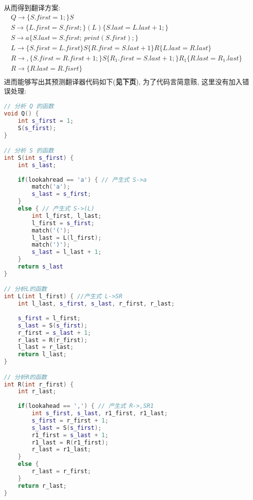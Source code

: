 \documentclass[UTF8]{article}
\begin{document}
从而得到翻译方案:
$$\begin{array}{l}
Q\rightarrow \{S.first=1;\}S\\
S\rightarrow \{L.first=S.first;\} (L) \{S.last=L.last+1;\}\\
S\rightarrow a\{S.last=S.first;\ print(S.first);\}\\
L\rightarrow \{S.first=L.first\}S\{R.first=S.last+1\}R\{L.last=R.last\}\\
R\rightarrow ,\{S.first=R.first+1;\}S\{R_1.first=S.last+1;\}R_1\{R.last=R_1.last\}\\
R\rightarrow \{R.last=R.fisrt\}\\
\end{array}$$
进而能够写出其预测翻译器代码如下(\textbf{见下页}), 为了代码言简意赅, 这里没有加入错误处理:
\newpage
\begin{lstlisting}[language=c++]
// 分析 Q 的函数
void Q() {
	int s_first = 1;
	S(s_first);
}

// 分析 S 的函数
int S(int s_first) {
	int s_last;
	
	if(lookahread == 'a') { // 产生式 S->a
		match('a');
		s_last = s_first;
	}
	else { // 产生式 S->(L)
		int l_first, l_last;
		l_first = s_first;
		match('(');
		l_last = L(l_first);
		match(')');
		s_last = l_last + 1;
	}
	return s_last
}

// 分析L的函数
int L(int l_first) { //产生式 L->SR
	int l_last, s_first, s_last, r_first, r_last;
	
	s_first = l_first;
	s_last = S(s_first);
	r_first = s_last + 1;
	r_last = R(r_first);
	l_last = r_last;
	return l_last;
}

// 分析R的函数
int R(int r_first) {
	int r_last;
	
	if(lookahead == ',') { // 产生式 R->,SR1
		int s_first, s_last, r1_first, r1_last;
		s_first = r_first + 1;
		s_last = S(s_first);
		r1_first = s_last + 1;
		r1_last = R(r1_first);
		r_last = r1_last;
	}
	else {
		r_last = r_first;
	}
	return r_last;
}

\end{lstlisting}
\end{document}
